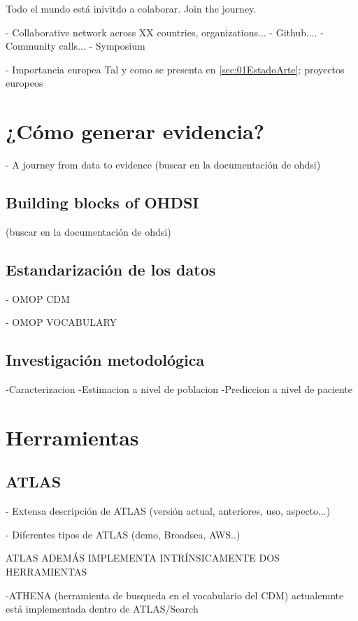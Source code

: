 Todo el mundo está inivitdo a colaborar. Join the journey. 

- Collaborative network across XX countries, organizations...
- Github....
- Community calls...
-  Symposium

- Importancia europea Tal y como se presenta en \ref{sec:01EstadoArte}: proyectos europeos

\section{¿Cómo generar evidencia?}

- A journey from data to evidence (buscar en la documentación de ohdsi)

\subsection{Building blocks of OHDSI}

(buscar en la documentación de ohdsi)


\subsection{Estandarización de los datos}

- OMOP CDM

- OMOP VOCABULARY

\subsection{Investigación metodológica}
-Caracterizacion
-Estimacion a nivel de poblacion
-Prediccion a nivel de paciente

\section{Herramientas}
\subsection{ATLAS}

- Extensa descripción de ATLAS (versión actual, anteriores, uso, aspecto...)

- Diferentes tipos de ATLAS (demo, Broadsea, AWS..)

ATLAS ADEMÁS IMPLEMENTA INTRÍNSICAMENTE  DOS HERRAMIENTAS

-ATHENA (herramienta de busqueda en el vocabulario del CDM) actualemnte está implementada dentro de ATLAS/Search

